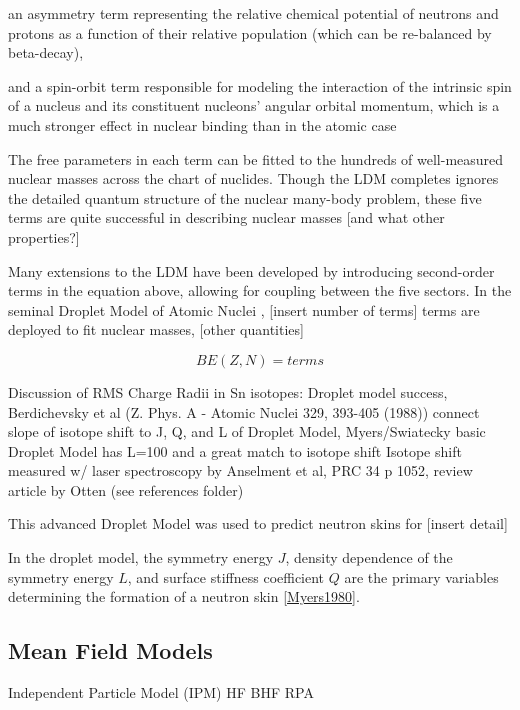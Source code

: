 an asymmetry term representing the relative chemical potential of neutrons and
protons as a function of their relative population (which can be re-balanced by
beta-decay),

and a spin-orbit term responsible for modeling the interaction of the intrinsic spin
of a nucleus and its constituent nucleons' angular orbital momentum, which is
a much stronger effect in nuclear binding than in the atomic case

The free parameters in each term can be fitted to the hundreds of well-measured nuclear masses
across the chart of nuclides. Though the LDM completes ignores the detailed
quantum structure of the nuclear many-body problem, these five terms are quite successful
in describing nuclear masses [and what other properties?]

Many extensions to the LDM have been developed by introducing second-order terms in the equation
above, allowing for coupling between the five sectors. In the seminal Droplet Model of Atomic Nuclei
\cite{MyersAndSwiatecki}, [insert number of terms] terms are deployed to fit nuclear masses, [other
quantities]

\begin{equation} \label{MyersAndSwiateckiLDM}
    BE(Z, N) = terms
\end{equation}

Discussion of RMS Charge Radii in Sn isotopes: Droplet model success,
Berdichevsky et al (Z. Phys. A - Atomic Nuclei 329, 393-405 (1988)) connect
slope of isotope shift to J, Q, and L of Droplet Model, Myers/Swiatecky basic
Droplet Model has L=100 and a great match to isotope shift
Isotope shift measured w/ laser spectroscopy by Anselment et al, PRC 34 p 1052,
review article by Otten (see references folder)

This advanced Droplet Model was used to predict neutron skins for [insert detail] \cite{Myers1980}

\cite{MyersAndSwiatecki}

In the droplet model, the symmetry energy $J$, density dependence of the symmetry energy
$L$, and surface stiffness coefficient $Q$ are the primary variables determining the formation of a 
neutron skin \ref{Myers1980}.

\subsection{Mean Field Models}

Independent Particle Model (IPM)
HF
BHF
RPA

